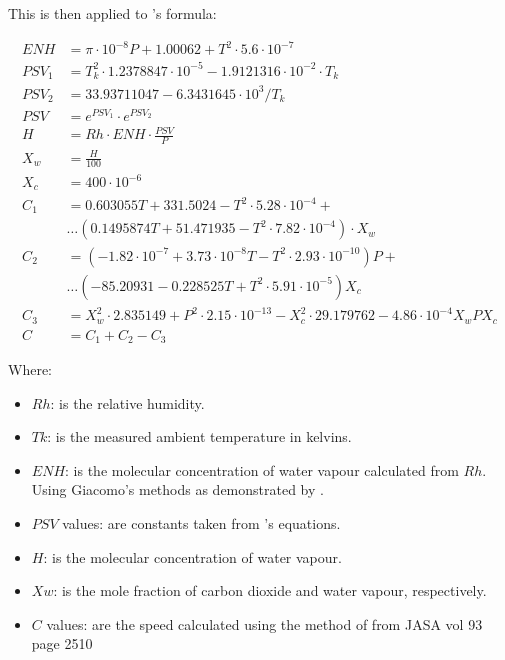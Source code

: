         This is then applied to \citeauthor{cramer1993}'s formula:

        \begin{equation*}\label{eq:complex_speed_of_sound}
            \begin{aligned}
            ENH &= \pi \cdot 10^{-8}P + 1.00062 + T^2 \cdot 5.6 \cdot 10^{-7} \\
            PSV_1 &= T_k^2 \cdot 1.2378847 \cdot 10^{-5} - 1.9121316 \cdot 10^{-2} \cdot T_k \\
            PSV_2 &= 33.93711047 - 6.3431645 \cdot 10^3 / T_k \\
            PSV &= e^{PSV_1} \cdot e^{PSV_2} \\
            H &= Rh \cdot ENH \cdot \frac{PSV}{P} \\
            X_w &= \frac{H}{100} \\
            X_c &= 400 \cdot 10^{-6} \\
            C_1 &= 0.603055T + 331.5024 - T^2 \cdot 5.28 \cdot 10^{-4} + \\ & \ldots (0.1495874T + 51.471935 - T^2 \cdot 7.82 \cdot 10^{-4}) \cdot X_w \\
            C_2 &= (-1.82 \cdot 10^{-7} + 3.73 \cdot 10^{-8}T - T^2 \cdot 2.93 \cdot 10^{-10})P + \\ & \ldots (-85.20931 - 0.228525T + T^2 \cdot 5.91 \cdot 10^{-5})X_c \\
            C_3 &= X_w^2 \cdot 2.835149 + P^2 \cdot 2.15 \cdot 10^{-13} - X_c^2 \cdot 29.179762 - 4.86 \cdot 10^{-4}X_wPX_c \\
            C &= C_1 + C_2 - C_3
            \end{aligned}
        \end{equation*}

        Where:
        \begin{itemize}
            \item $Rh$: is the relative humidity.
            \item $Tk$: is the measured ambient temperature in kelvins.
            \item $ENH$: is the molecular concentration of water vapour calculated from $Rh$. Using Giacomo's methods as demonstrated by \citeauthor{rasmussen1997}.
            \item $PSV$ values: are constants taken from \citeauthor{cramer1993}'s equations.
            \item $H$: is the molecular concentration of water vapour.
            \item $Xw$: is the mole fraction of carbon dioxide and water vapour, respectively.
            \item $C$ values: are the speed calculated using the method of \citeauthor{cramer1993} from JASA vol 93 page 2510
        \end{itemize}
        
